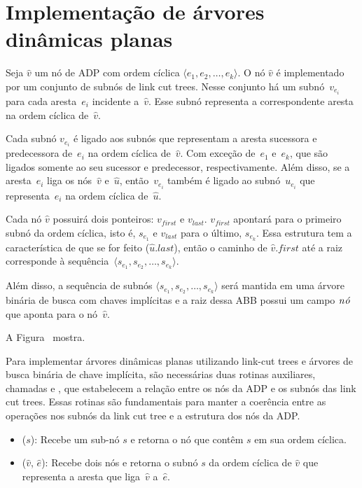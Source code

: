 \section{Implementação de árvores dinâmicas planas}
\label{sec:implementacao-ADP}


Seja $\hat v$ um nó de ADP com ordem cíclica $\langle e_1, e_2, \ldots, e_k\rangle$.
O nó $\hat v$ é implementado por um conjunto de subnós de link cut trees.
Nesse conjunto há um subnó~$v_{e_i}$ para cada aresta~$e_i$ incidente a~$\hat v$.
Esse subnó representa a correspondente aresta na ordem cíclica de~$\hat v$.

Cada subnó $v_{e_i}$ é ligado aos subnós que representam a aresta sucessora e predecessora de~$e_i$ na ordem cíclica de~$\hat v$.
Com exceção de~$e_1$ e~$e_k$, que são ligados somente ao seu sucessor e predecessor, respectivamente.
Além disso, se a aresta~$e_i$ liga os nós~$\hat v$ e~$\hat u$, então~$v_{e_i}$ também é ligado ao subnó~$u_{e_i}$ que representa~$e_i$ na ordem cíclica de~$\hat u$.

Cada nó $\hat v$ possuirá dois ponteiros: $v_{first}$ e $v_{last}$.
$v_{first}$ apontará para o primeiro subnó da ordem cíclica, isto é, $s_{e_1}$ e $v_{last}$ para o último, $s_{e_k}$.
Essa estrutura tem a característica de que se for feito \linkcutEvert($\hat u$.$last$), então o caminho de $\hat v$.$first$ até a raiz corresponde à sequência~$\langle s_{e_1}, s_{e_2}, \ldots, s_{e_k}\rangle$.

Além disso, a sequência de subnós $\langle s_{e_1}, s_{e_2}, \ldots, s_{e_k}\rangle$ será mantida em uma árvore binária de busca com chaves implícitas e a raiz dessa ABB possui um campo $\mathit{n\acute{o}}$ que aponta para o nó~$\hat v$.

A Figura~ mostra.

Para implementar árvores dinâmicas planas utilizando link-cut trees e árvores de busca binária de chave implícita, são necessárias duas rotinas auxiliares, chamadas \LCOFindNode{} e \LCOFindSubNode{}, que estabelecem a relação entre os nós da ADP e os subnós das link cut trees.
Essas rotinas são fundamentais para manter a coerência entre as operações nos subnós da link cut tree e a estrutura dos nós da ADP.

\begin{itemize}
\item \LCOFindNode($s$): Recebe um sub-nó $s$ e retorna o nó que contêm $s$ em sua ordem cíclica.
\item \LCOFindSubNode($\hat v$, $\hat e$): Recebe dois nós e retorna o subnó $s$ da ordem cíclica de $\hat v$ que representa a aresta que liga~$\hat v$ a~$\hat e$.
\end{itemize}


